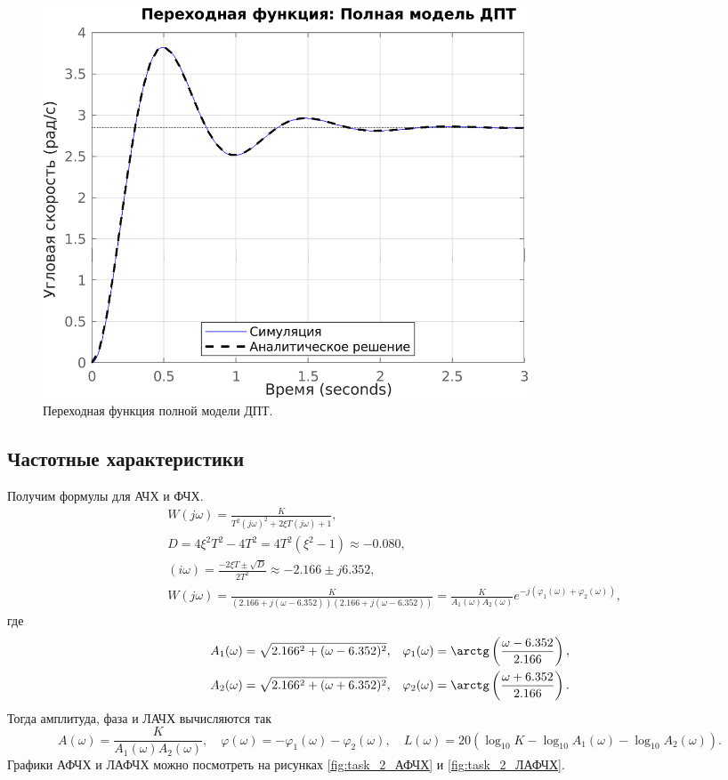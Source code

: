 \begin{figure}[htbp]
    \centering
    \includegraphics[width=0.7\textwidth]{figs/task_2_step.png}
    \caption{Переходная функция полной модели ДПТ.}
    \label{fig:task_2_step}
\end{figure}


\subsection{Частотные характеристики}

Получим формулы для АЧХ и ФЧХ.
\begin{equation*}
    \begin{split}
        &W(j\omega)=\frac{K}{T^2(j\omega)^2+2\xi T (j\omega)+1},\\
        &D=4\xi^2T^2-4T^2=4T^2(\xi^2-1)\approx-0.080,\\
        &(i\omega)=\frac{-2\xi T\pm\sqrt{D}}{2T^2}\approx-2.166\pm j6.352,\\
        &W(j\omega)=\frac{K}{(2.166+j(\omega-6.352))(2.166+j(\omega-6.352))}=\frac{K}{A_1(\omega)A_2(\omega)}e^{-j(\varphi_1(\omega)+\varphi_2(\omega))},
    \end{split}
\end{equation*}
где 
\begin{equation*}
    \begin{aligned}
        A_1(\omega)=\sqrt{2.166^2+(\omega-6.352)^2},&\quad \varphi_1(\omega)=\arctg\left(\frac{\omega-6.352}{2.166}\right),\\
        A_2(\omega)=\sqrt{2.166^2+(\omega+6.352)^2},&\quad \varphi_2(\omega)=\arctg\left(\frac{\omega+6.352}{2.166}\right).
    \end{aligned}
\end{equation*}
Тогда амплитуда, фаза и ЛАЧХ вычисляются так
\begin{equation*}
    A(\omega)=\frac{K}{A_1(\omega)A_2(\omega)},\quad \varphi(\omega)=-\varphi_1(\omega)-\varphi_2(\omega),\quad L(\omega)=20(\log_{10}K-\log_{10}A_1(\omega)-\log_{10}A_2(\omega)).
\end{equation*}
Графики АФЧХ и ЛАФЧХ можно посмотреть на рисунках \ref{fig:task_2_АФЧХ} и \ref{fig:task_2_ЛАФЧХ}.

